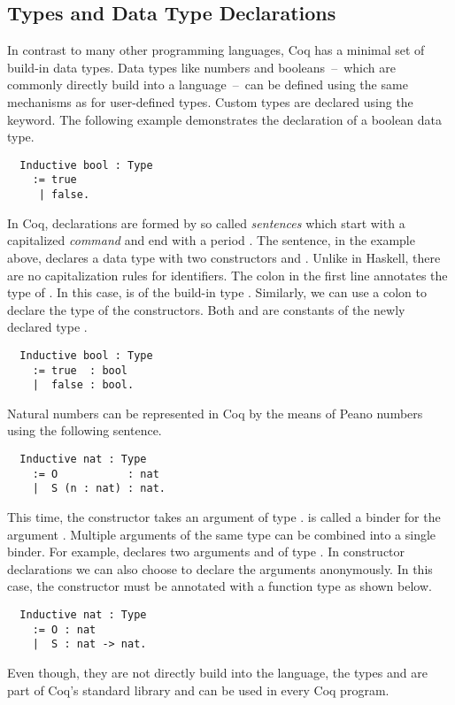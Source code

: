 \subsection{Types and Data Type Declarations} \label{sec:preliminaries:coq:data-decls}
In contrast to many other programming languages, Coq has a minimal set of build-in data types.
Data types like numbers and booleans~--~which are commonly directly build into a language~--~can be defined using the same mechanisms as for user-defined types.
Custom types are declared using the  keyword.
The following example demonstrates the declaration of a boolean data type.
\begin{verbatim}
  Inductive bool : Type
    := true
     | false.
\end{verbatim}
In Coq, declarations are formed by so called \textit{sentences} which start with a capitalized \textit{command} and end with a period \cite[p.~30]{CoqDevTeam:2018}.
The  sentence, in the example above, declares a data type  with two constructors  and .
Unlike in Haskell, there are no capitalization rules for identifiers.
The colon in the first line annotates the type of .
In this case,  is of the build-in type .
Similarly, we can use a colon to declare the type of the constructors.
Both  and  are constants of the newly declared type .
\begin{verbatim}
  Inductive bool : Type
    := true  : bool
    |  false : bool.
\end{verbatim}
Natural numbers can be represented in Coq by the means of Peano numbers using the following  sentence.
\begin{verbatim}
  Inductive nat : Type
    := O           : nat
    |  S (n : nat) : nat.
\end{verbatim}
This time, the constructor  takes an argument  of type .
 is called a binder for the argument .
Multiple arguments of the same type can be combined into a single binder.
For example,  declares two arguments  and   of type .
In constructor declarations we can also choose to declare the arguments anonymously.
In this case, the constructor  must be annotated with a function type as shown below.
\begin{verbatim}
  Inductive nat : Type
    := O : nat
    |  S : nat -> nat.
\end{verbatim}
Even though, they are not directly build into the language, the types  and  are part of Coq's standard library and can be used in every Coq program.

